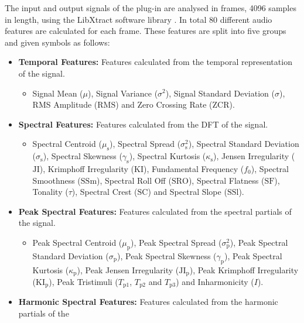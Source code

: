 		The input and output signals of the plug-in are analysed in frames, 4096 samples in length, using the
		LibXtract software library \citep{bullock2007libxtract}. In total 80 different audio features are
		calculated for each frame. These features are split into five groups and given symbols as follows:

		\begin{itemize}
			\item {\bf{Temporal Features:}} Features calculated from the temporal representation of the signal.
			\begin{itemize}
				\item Signal Mean ($\mu$), Signal Variance ($\sigma^{2}$), Signal Standard Deviation
				      ($\sigma$), RMS Amplitude ($\mathrm{RMS}$) and Zero Crossing Rate ($\mathrm{ZCR}$).
			\end{itemize}
			\item {\bf{Spectral Features:}} Features calculated from the DFT of the signal.
			\begin{itemize}
				\item Spectral Centroid ($\mu_{\mathrm{s}}$), Spectral Spread ($\sigma_{\mathrm{s}}^{2}$),
				      Spectral Standard Deviation ($\sigma_{\mathrm{s}}$), Spectral Skewness
				      ($\gamma_{\mathrm{s}}$), Spectral Kurtosis ($\kappa_{\mathrm{s}}$), Jensen
				      Irregularity ($\mathrm{JI}$), Krimphoff Irregularity ($\mathrm{KI}$), Fundamental
				      Frequency ($f_{0}$), Spectral Smoothness ($\mathrm{SSm}$), Spectral Roll Off
				      ($\mathrm{SRO}$), Spectral Flatness ($\mathrm{SF}$), Tonality ($\tau$), Spectral
				      Crest ($\mathrm{SC}$) and Spectral Slope ($\mathrm{SSl}$).
			\end{itemize}
			\item {\bf{Peak Spectral Features:}} Features calculated from the spectral partials of the signal.
			\begin{itemize}
				\item Peak Spectral Centroid ($\mu_{\mathrm{p}}$), Peak Spectral Spread
				      ($\sigma_{\mathrm{p}}^{2}$), Peak Spectral Standard Deviation
				      ($\sigma_{\mathrm{p}}$), Peak Spectral Skewness ($\gamma_{\mathrm{p}}$), Peak
				      Spectral Kurtosis ($\kappa_{\mathrm{p}}$), Peak Jensen Irregularity
				      ($\mathrm{JI_{p}}$), Peak Krimphoff Irregularity
				      ($\mathrm{KI_{p}}$), Peak Tristimuli ($T_{\mathrm{p}1}$, $T_{\mathrm{p}2}$
				      and $T_{\mathrm{p}3}$) and Inharmonicity ($I$).
			\end{itemize}
			\item {\bf{Harmonic Spectral Features:}} Features calculated from the harmonic partials of the

\end{itemize}
